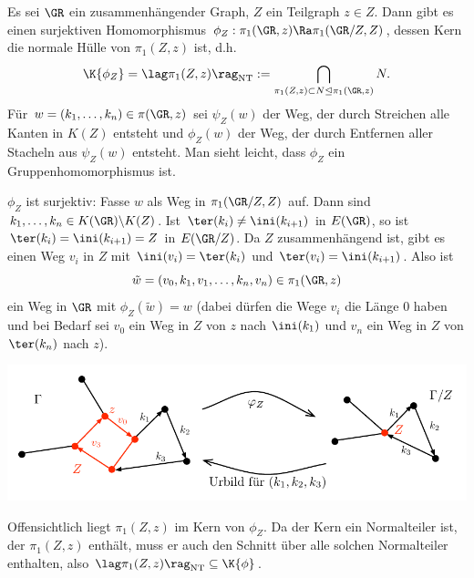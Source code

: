\BEM Es sei $\GR$ ein zusammenhängender Graph, $Z$ ein Teilgraph
$z\in Z$.
Dann gibt es einen surjektiven Homomorphismus
$\phi_Z:\pi_1(\GR,z)\Ra\pi_1(\GR/Z,Z)$, dessen Kern die
normale Hülle von $\pi_1(Z,z)$ ist, d.h.
\[
\K{\phi_Z}=\lag\pi_1(Z,z)\rag_{\mathrm{NT}}:=
\bigcap_{\pi_1(Z,z)\subset N \unlhd \pi_1(\GR,z)} N.
\]
\bew Für $w=(k_1,\ldots,k_n)\in\pi(\GR,z)$ sei
$\psi_Z(w)$ der Weg, der durch Streichen alle Kanten in $K(Z)$
entsteht und $\phi_Z(w)$ der Weg, der durch Entfernen aller Stacheln
aus $\psi_Z(w)$ entsteht. Man sieht leicht, dass $\phi_Z$ ein
Gruppenhomomorphismus ist.

$\phi_Z$ ist surjektiv: Fasse $w$ als Weg in $\pi_1(\GR/Z,Z)$ auf.
Dann sind $k_1,\ldots,k_n\in K(\GR)\backslash K(Z)$.
Ist $\ter(k_i)\neq \ini(k_{i+1})$ in $E(\GR)$, so ist
$\ter(k_i)=\ini(k_{i+1})=Z$ in $E(\GR/Z)$.
Da $Z$ zusammenhängend ist, gibt es einen Weg $v_i$ in $Z$ mit
$\ini(v_i)=\ter(k_i)$ und $\ter(v_i)=\ini(k_{i+1})$.
Also ist
\[
\tilde{w}=
(v_0,k_1,v_1,\ldots,k_n,v_n) \in \pi_1(\GR,z)
\]
ein Weg in $\GR$ mit $\phi_Z(\tilde{w})=w$
(dabei dürfen die Wege $v_i$ die Länge $0$ haben und bei Bedarf
sei $v_0$ ein Weg in $Z$ von $z$ nach $\ini(k_1)$ und $v_n$ ein
Weg in $Z$ von $\ter(k_n)$ nach $z$).
\begin{center}
	\includegraphics{grugraImages/phiZ}
\end{center}
Offensichtlich liegt $\pi_1(Z,z)$ im Kern von $\phi_Z$. Da der Kern
ein Normalteiler ist, der $\pi_1(Z,z)$ enthält, muss er auch
den Schnitt über alle solchen Normalteiler enthalten,
also $\lag \pi_1(Z,z)\rag_{\mathrm{NT}}\subseteq \K{\phi}$.

